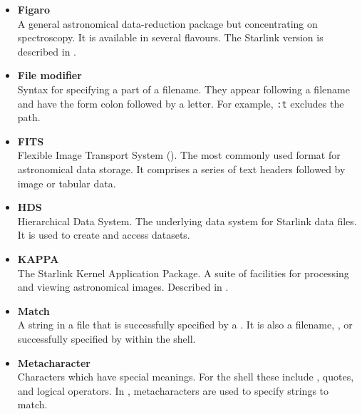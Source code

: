 \begin{itemize}
\item {\bf\label{sc4_gl_figaro}Figaro}\\
      A general astronomical data-reduction package but concentrating
      on spectroscopy.  It is available in several flavours.  The Starlink
      version is described in .

\item {\bf\label{sc4_gl_filmod}File modifier}\\
      Syntax for specifying a part of a filename.  They appear following
      a filename and have the form colon followed by a letter.  For
      example, {\tt :t} excludes the path.

\item {\bf\label{sc4_gl_fits}FITS}\\
      Flexible Image Transport System (\FITSref).  The most commonly used 
      format for astronomical data storage.  It comprises a series of
      text headers followed by image or tabular data. 

\item {\bf\label{sc4_gl_hds}HDS}\\
      Hierarchical Data System.  The underlying data system for Starlink
      data files.  It is used to create and access 
      datasets.

\item {\bf\label{sc4_gl_kappa}KAPPA}\\
      The Starlink Kernel Application Package.  A suite of facilities
      for processing and viewing astronomical images.
      Described in .

\item {\bf\label{sc4_gl_match}Match}\\
      A string in a file that is successfully specified by a 
      .  It is also
      a filename, , or
       successfully specified by
       within the shell.

\item {\bf\label{sc4_gl_met}Metacharacter}\\
      Characters which have special meanings.  For the shell these
      include , quotes, and logical
      operators.  In ,
      metacharacters are used to specify strings to match.


\end{itemize}
